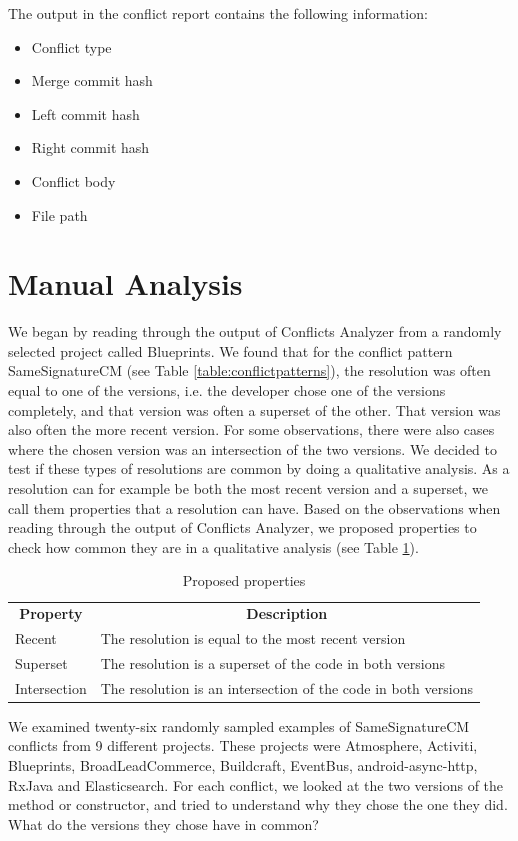 The output in the conflict report contains the following information:
\begin{itemize}
\item Conflict type
\item Merge commit hash
\item Left commit hash
\item Right commit hash
\item Conflict body
\item File path
\end{itemize}

\section{Manual Analysis}\label{sec:manual}
\FloatBarrier
We began by reading through the output of Conflicts Analyzer from a randomly selected project called Blueprints. We found that for the conflict pattern SameSignatureCM (see Table \ref{table:conflictpatterns}), the resolution was often equal to one of the versions, i.e. the developer chose one of the versions completely, and that version was often a superset of the other. That version was also often the more recent version. For some observations, there were also cases where the chosen version was an intersection of the two versions. We decided to test if these types of resolutions are common by doing a qualitative analysis. As a resolution can for example be both the most recent version and a superset, we call them properties that a resolution can have. Based on the observations when reading through the output of Conflicts Analyzer, we proposed properties to check how common they are in a qualitative analysis (see Table \ref{table:pproperties}).
\begin{table}
\caption{Proposed properties}\label{table:pproperties}
\begin{tabular}{ p{7cm} p{7cm} }
\hline
\multicolumn{1}{c}{\textbf{Property}} & \multicolumn{1}{c}{\textbf{Description}}\\
Recent & The resolution is equal to the most recent version\\
Superset & The resolution is a superset of the code in both versions\\
Intersection & The resolution is an intersection of the code in both versions\\
\end{tabular}
\end{table}
\FloatBarrier

We examined twenty-six randomly sampled examples of SameSignatureCM conflicts from 9 different projects. These projects were Atmosphere, Activiti, Blueprints, BroadLeadCommerce, Buildcraft, EventBus, android-async-http, RxJava and Elasticsearch. For each conflict, we looked at the two versions of the method or constructor, and tried to understand why they chose the one they did. What do the versions they chose have in common?

